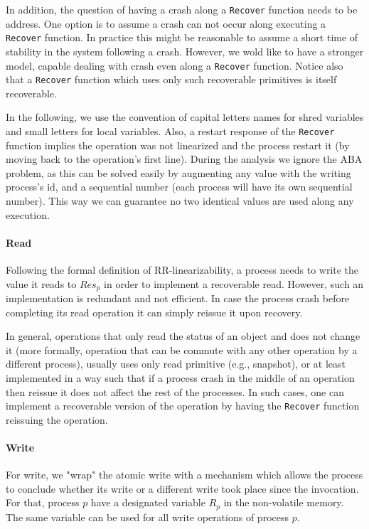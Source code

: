 In addition, the question of having a crash along a \texttt{Recover} function needs to be address. One option is to assume a crash can not occur along executing a \texttt{Recover} function. In practice this might be reasonable to assume a short time of stability in the system following a crash. However, we wold like to have a stronger model, capable dealing with crash even along a \texttt{Recover} function. Notice also that a \texttt{Recover} function which uses only such recoverable primitives is itself recoverable.

In the following, we use the convention of capital letters names for shred variables and small letters for local variables. Also, a restart response of the \texttt{Recover} function implies the operation was not linearized and the process restart it (by moving back to the operation's first line). During the analysis we ignore the ABA problem, as this can be solved easily by augmenting any value with the writing process's id, and a sequential number (each process will have its own sequential number). This way we can guarantee no two identical values are used along any execution.

\paragraph*{Read}

Following the formal definition of RR-linearizability, a process needs to write the value it reads to $Res_p$ in order to implement a recoverable read. However, such an implementation is redundant and not efficient. In case the process crash before completing its read operation it can simply reissue it upon recovery.

In general, operations that only read the status of an object and does not change it (more formally, operation that can be commute with any other operation by a different process), usually uses only read primitive (e.g., snapshot), or at least implemented in a way such that if a process crash in the middle of an operation then reissue it does not affect the rest of the processes. In such cases, one can implement a recoverable version of the operation by having the \texttt{Recover} function reissuing the operation.

\paragraph*{Write}
For write, we "wrap" the atomic write with a mechanism which allows the process to conclude whether its write or a different write took place since the invocation. For that, process $p$ have a designated variable $R_p$ in the non-volatile memory. The same variable can be used for all write operations of process $p$.

